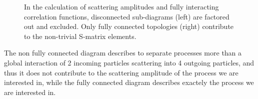 \begin{example}
\begin{figure}[H]
\begin{minipage}{0.6\textwidth}
        \end{minipage}
        \hfill
        \begin{minipage}{0.35\textwidth}
            \caption{In the calculation of scattering amplitudes and fully interacting correlation functions, disconnected sub-diagrams (left) are factored out and excluded. Only fully connected topologies (right) contribute to the non-trivial S-matrix elements.}
        \end{minipage}
        \label{fig:connected_vs_disconnected}
    \end{figure}
    The non fully connected diagram describes to separate processes more than a global interaction of 2 incoming particles scattering into 4 outgoing particles, and thus it does not contribute to the scattering amplitude of the process we are interested in, while the fully connected diagram describes exactely the process we are interested in.
\end{example}

